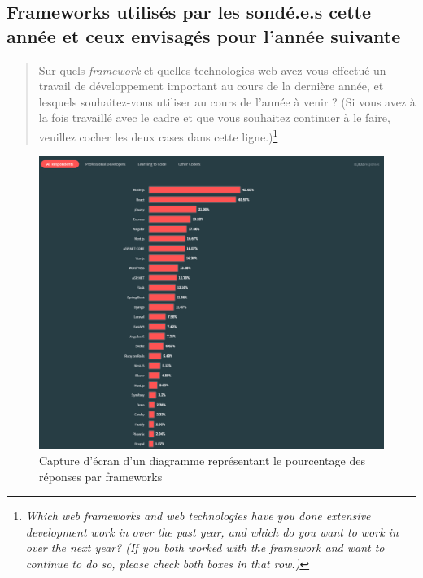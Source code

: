 \subsection{Frameworks utilisés par les sondé.e.s cette année et ceux envisagés pour l'année suivante}

\begin{quote}
    Sur quels \textit{framework} et quelles technologies web avez-vous effectué un travail de développement important au cours de la dernière année, et lesquels souhaitez-vous utiliser au cours de l'année à venir ? (Si vous avez à la fois travaillé avec le cadre et que vous souhaitez continuer à le faire, veuillez cocher les deux cases dans cette ligne.)\footnote{\textit{Which web frameworks and web technologies have you done extensive development work in over the past year, and which do you want to work in over the next year? (If you both worked with the framework and want to continue to do so, please check both boxes in that row.)}}
\end{quote}

\begin{figure}[H]
        \centering
        \includegraphics[width=15cm]{images/extrait_sondage_stackoverflow_framework.PNG}
        \caption{Capture d'écran d'un diagramme représentant le pourcentage des réponses par frameworks}
        \label{fig:StackoverflowFrameworks}
\end{figure}


